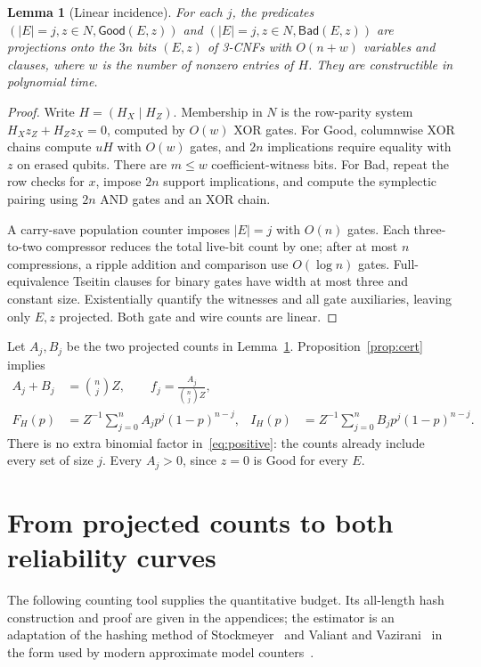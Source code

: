 \documentclass[11pt]{article}
\newtheorem{lemma}[theorem]{Lemma}
\theoremstyle{remark}
\newcommand{\Good}{\mathsf{Good}}
\newcommand{\Bad}{\mathsf{Bad}}
\begin{document}
\begin{lemma}[Linear incidence]\label{lem:cnf}
For each \(j\), the predicates
\((|E|=j,z\in N,\Good(E,z))\) and
\((|E|=j,z\in N,\Bad(E,z))\) are projections onto the \(3n\) bits
\((E,z)\) of 3-CNFs with \(O(n+w)\) variables and clauses, where
\(w\) is the number of nonzero entries of \(H\).
They are constructible in polynomial time.
\end{lemma}
\begin{proof}
Write \(H=(H_X\mid H_Z)\). Membership in \(N\) is the row-parity
system \(H_Xz_Z+H_Zz_X=0\), computed by \(O(w)\) XOR gates.
For Good, columnwise XOR chains compute \(uH\) with \(O(w)\) gates,
and \(2n\) implications require equality with \(z\) on erased qubits.
There are \(m\le w\) coefficient-witness bits.
For Bad, repeat the row checks for \(x\), impose \(2n\) support
implications, and compute the symplectic pairing using \(2n\) AND
gates and an XOR chain.

A carry-save population counter imposes \(|E|=j\) with \(O(n)\)
gates. Each three-to-two compressor reduces the total live-bit count
by one; after at most \(n\) compressions, a ripple addition and
comparison use \(O(\log n)\) gates. Full-equivalence Tseitin
clauses for binary gates have width at most three and constant size.
Existentially quantify the witnesses and all gate auxiliaries,
leaving only \(E,z\) projected. Both gate and wire counts are linear.
\end{proof}

Let \(A_j,B_j\) be the two projected counts in Lemma~\ref{lem:cnf}.
Proposition~\ref{prop:cert} implies
\begin{align}
 A_j+B_j&=\binom njZ,\qquad
 f_j=\frac{A_j}{\binom njZ},\label{eq:layers}\\
 F_H(p)&=Z^{-1}\sum_{j=0}^n A_jp^j(1-p)^{n-j},&
 I_H(p)&=Z^{-1}\sum_{j=0}^n B_jp^j(1-p)^{n-j}.\label{eq:positive}
\end{align}
There is no extra binomial factor in~\eqref{eq:positive}: the counts
already include every set of size \(j\). Every \(A_j>0\), since
\(z=0\) is Good for every \(E\).

\section{From projected counts to both reliability curves}
\label{sec:transfer}

The following counting tool supplies the quantitative budget.
Its all-length hash construction and proof are given in the appendices;
the estimator is an adaptation of the hashing method of
Stockmeyer~\cite{stockmeyer1985} and Valiant and
Vazirani~\cite{valiantvazirani1986} in the form used by modern
approximate model counters~\cite{gomes2006,cmv2013}.
\end{document}
